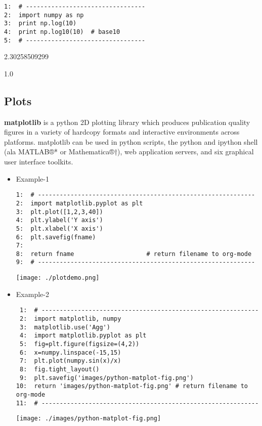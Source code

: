 \documentclass[11pt]{article}
\begin{document}
\begin{verbatim}
1:  # ---------------------------------
2:  import numpy as np
3:  print np.log(10)
4:  print np.log10(10)  # base10
5:  # ---------------------------------
\end{verbatim}

     2.30258509299

     1.0
\subsection{Plots}
\label{sec-1-3}


    \textbf{matplotlib} is a python 2D plotting library which produces
    publication quality figures in a variety of hardcopy formats and
    interactive environments across platforms. matplotlib can be used
    in python scripts, the python and ipython shell (ala MATLAB®* or
    Mathematica®†), web application servers, and six graphical user
    interface toolkits.

\begin{itemize}
\item Example-1
    

\begin{verbatim}
1:  # ------------------------------------------------------------
2:  import matplotlib.pyplot as plt
3:  plt.plot([1,2,3,40])
4:  plt.ylabel('Y axis')
5:  plt.xlabel('X axis')
6:  plt.savefig(fname)
7:  
8:  return fname                    # return filename to org-mode
9:  # ------------------------------------------------------------
\end{verbatim}

     \texttt{[image: ./plotdemo.png]}
\end{itemize}


\begin{itemize}
\item Example-2


\begin{verbatim}
 1:  # ------------------------------------------------------------
 2:  import matplotlib, numpy
 3:  matplotlib.use('Agg')
 4:  import matplotlib.pyplot as plt
 5:  fig=plt.figure(figsize=(4,2))
 6:  x=numpy.linspace(-15,15)
 7:  plt.plot(numpy.sin(x)/x)
 8:  fig.tight_layout()
 9:  plt.savefig('images/python-matplot-fig.png')
10:  return 'images/python-matplot-fig.png' # return filename to org-mode
11:  # ------------------------------------------------------------
\end{verbatim}

     \texttt{[image: ./images/python-matplot-fig.png]}
\end{itemize}
\end{document}
